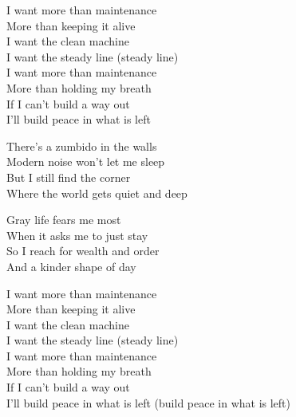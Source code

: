 \begin{lyrics}
I want more than maintenance\\
More than keeping it alive\\
I want the clean machine\\
I want the steady line
(steady line)\\
I want more than maintenance\\
More than holding my breath\\
If I can’t build a way out\\
I’ll build peace in what is left

There’s a zumbido in the walls\\
Modern noise won’t let me sleep\\
But I still find the corner\\
Where the world gets quiet and deep

Gray life fears me most\\
When it asks me to just stay\\
So I reach for wealth and order\\
And a kinder shape of day

I want more than maintenance\\
More than keeping it alive\\
I want the clean machine\\
I want the steady line
(steady line)\\
I want more than maintenance\\
More than holding my breath\\
If I can’t build a way out\\
I’ll build peace in what is left
(build peace in what is left)
\end{lyrics}

